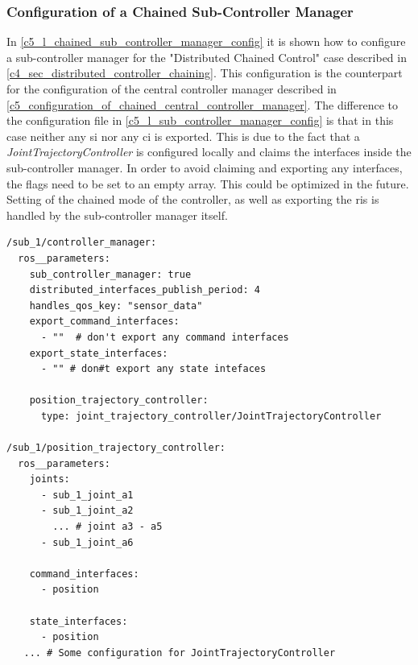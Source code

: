 \subsubsection{Configuration of a Chained Sub-Controller Manager}\label{c5_sec_sub_chained_controller_configuration}
In \autoref{c5_l_chained_sub_controller_manager_config} it is shown how to configure a sub-controller manager for the "Distributed Chained Control" case described in \autoref{c4_sec_distributed_controller_chaining}. This configuration is the counterpart for the configuration of the central controller manager described in \autoref{c5_configuration_of_chained_central_controller_manager}.\newline
The difference to the configuration file in \autoref{c5_l_sub_controller_manager_config} is that in this case neither any \gls{si} nor any \gls{ci} is exported. This is due to the fact that a \textit{JointTrajectoryController} is configured locally and claims the interfaces inside the sub-controller manager. In order to avoid claiming and exporting any interfaces, the flags need to be set to an empty array. This could be optimized in the future. Setting of the chained mode of the controller, as well as exporting the \glspl{ri} is handled by the sub-controller manager itself. 
\lstset{language=yaml,basicstyle=\small}
\begin{lstlisting}[caption=Example configuration of a chained sub-controller manager.,label=c5_l_chained_sub_controller_manager_config]
/sub_1/controller_manager:
  ros__parameters:
    sub_controller_manager: true
    distributed_interfaces_publish_period: 4
    handles_qos_key: "sensor_data"
    export_command_interfaces:
      - ""  # don't export any command interfaces
    export_state_interfaces:
      - "" # don#t export any state intefaces

    position_trajectory_controller:
      type: joint_trajectory_controller/JointTrajectoryController

/sub_1/position_trajectory_controller:
  ros__parameters:
    joints:
      - sub_1_joint_a1
      - sub_1_joint_a2
        ... # joint a3 - a5
      - sub_1_joint_a6

    command_interfaces:
      - position

    state_interfaces:
      - position
   ... # Some configuration for JointTrajectoryController 
\end{lstlisting}